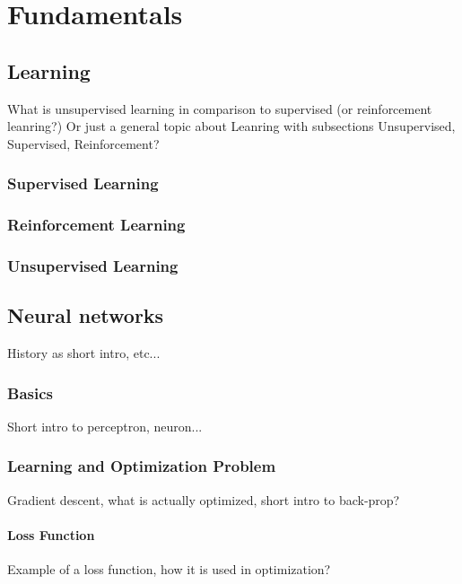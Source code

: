 
\chapter{Fundamentals}

\section{Learning}

What is unsupervised learning in comparison to supervised (or reinforcement leanring?)
Or just a general topic about Leanring with subsections Unsupervised, Supervised, Reinforcement?

\subsection{Supervised Learning}
\subsection{Reinforcement Learning}
\subsection{Unsupervised Learning}


\section{Neural networks}

History as short intro, etc...

\subsection{Basics}

Short intro to perceptron, neuron...

\subsection{Learning and Optimization Problem}

Gradient descent, what is actually optimized, short intro to back-prop?

\subsubsection{Loss Function}

Example of a loss function, how it is used in optimization?

